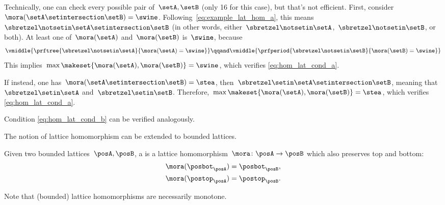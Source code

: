 \begin{example}
    Technically, one can check every possible pair of~$\setA,\setB$ (only 16 for this case), but that's not efficient.
    First, consider~$\mora(\setA\setintersection \setB)=\swine$.
    Following~\cref{eq:example_lat_hom_a}, this means~$\sbretzel \notsetin \setA\setintersection \setB$ (in other words, either~$\sbretzel \notsetin \setA$,~$\sbretzel \notsetin \setB$, or both).
    At least one of~$\mora(\setA)$ and~$\mora(\setB)$ is~$\swine$, because
    \begin{equation*}
        \vmiddle{
            \prftree{
                \sbretzel \notsetin \setA
            }{
                \mora(\setA) = \swine
            }
        }
        \qqand
        \vmiddle{
            \prfperiod{
                \sbretzel \notsetin \setB
            }{
                \mora(\setB) = \swine
            }
        }
    \end{equation*}
    This implies~$\max\makeset{\mora(\setA),\mora(\setB)}=\swine$, which verifies \cref{eq:hom_lat_cond_a}.

    If instead, one has~$\mora(\setA\setintersection \setB)=\stea$, then~$\sbretzel \setin \setA\setintersection \setB$, meaning that~$\sbretzel \setin \setA$ and~$\sbretzel \setin \setB$.
    Therefore,~$\max\makeset{ \mora(\setA),\mora(\setB)}=\stea$, which verifies \cref{eq:hom_lat_cond_a}.

    Condition \cref{eq:hom_lat_cond_b} can be verified analogously.
\end{example}

The notion of lattice homomorphism can be extended to bounded lattices.

\begin{ctdefinition}
    \label{def:bounded_lat_homomorphism}
    Given two bounded lattices~$\posA,\posB$, a \emph{} is a lattice homomorphism~$\mora\colon \posA\to \posB$ which also preserves top and bottom:
    \begin{equation}
        \begin{aligned}
            \mora(\posbot_\posA) & =\posbot_\posB, \\
            \mora(\postop_\posA) & =\postop_\posB.
        \end{aligned}
    \end{equation}
\end{ctdefinition}

Note that (bounded) lattice homomorphisms are necessarily monotone.

